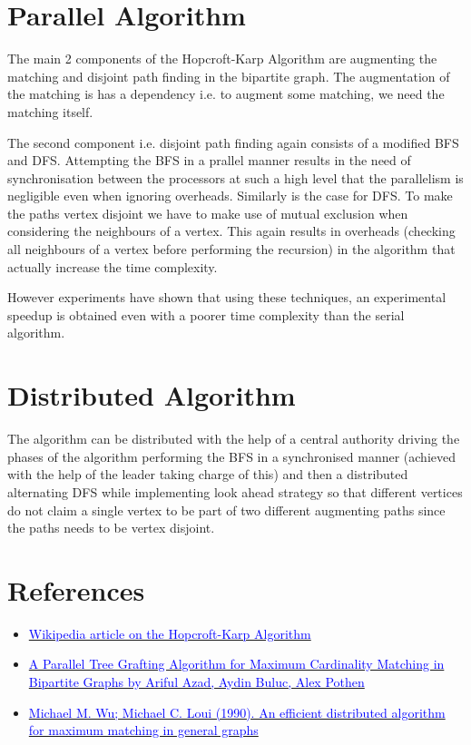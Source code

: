 \section{Parallel Algorithm}
The main 2 components of the Hopcroft-Karp Algorithm are augmenting the matching and disjoint path finding in the bipartite graph. The augmentation of the matching is has a dependency i.e. to augment some matching, we need the matching itself. 

The second component i.e. disjoint path finding again consists of a modified BFS and DFS. Attempting the BFS in a prallel manner results in the need of synchronisation between the processors at such a high level that the parallelism is negligible even when ignoring overheads. Similarly is the case for DFS. To make the paths vertex disjoint we have to make use of mutual exclusion when considering the neighbours of a vertex. This again results in overheads (checking all neighbours of a vertex before performing the recursion) in the algorithm that actually increase the time complexity. 

However experiments have shown that using these techniques, an experimental speedup is obtained even with a poorer time complexity than the serial algorithm.

\section{Distributed Algorithm}
The algorithm can be distributed with the help of a central authority driving the phases of the algorithm performing the BFS in a synchronised manner (achieved with the help of the leader taking charge of this) and then a distributed alternating DFS while implementing look ahead strategy so that different vertices do not claim a single vertex to be part of two different augmenting paths since the paths needs to be vertex disjoint.

\section{References}
\begin{itemize}
    \item \href{https://en.wikipedia.org/wiki/Hopcroft\%E2\%80\%93Karp_algorithm}{\textcolor{blue}{Wikipedia article on the Hopcroft-Karp Algorithm}}
    \item \href{https://people.eecs.berkeley.edu/~aydin/matchingGraft.pdf}{\textcolor{blue}{A Parallel Tree Grafting Algorithm for Maximum Cardinality Matching in Bipartite Graphs by Ariful Azad, Aydin Buluc, Alex Pothen}}
    \item \href{https://link.springer.com/article/10.1007\%2FBF01840395}{\textcolor{blue}{Michael M. Wu; Michael C. Loui (1990). An efficient distributed algorithm for maximum matching in general graphs}}
\end{itemize}




%
